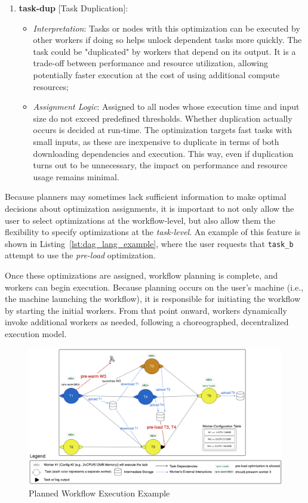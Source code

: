 \begin{enumerate}
\item\textbf{task-dup} [Task Duplication]:
\begin{itemize}
  \item \textit{Interpretation}: Tasks or nodes with this optimization can be executed by other workers if doing so helps unlock dependent tasks more quickly. The task could be "duplicated" by workers that depend on its output. It is a trade-off between performance and resource utilization, allowing potentially faster execution at the cost of using additional compute resources;
  \item \textit{Assignment Logic}: Assigned to all nodes whose execution time and input size do not exceed predefined thresholds. Whether duplication actually occurs is decided at run-time. The optimization targets fast tasks with small inputs, as these are inexpensive to duplicate in terms of both downloading dependencies and execution. This way, even if duplication turns out to be unnecessary, the impact on performance and resource usage remains minimal.
\end{itemize}
\end{enumerate}
Because planners may sometimes lack sufficient information to make optimal decisions about optimization assignments, it is important to not only allow the user to select optimizations at the workflow-level, but also allow them the flexibility to specify optimizations at the \textit{task-level}. An example of this feature is shown in Listing~\ref{lst:dag_lang_example}, where the user requests that \texttt{task\_b} attempt to use the \textit{pre-load} optimization.

Once these optimizations are assigned, workflow planning is complete, and workers can begin execution. Because planning occurs on the user's machine (i.e., the machine launching the workflow), it is responsible for initiating the workflow by starting the initial workers. From that point onward, workers dynamically invoke additional workers as needed, following a choreographed, decentralized execution model.

\begin{figure}[h]
    \centering
    \includegraphics[width=\textwidth]{Images/mine/solution_workflowinstanceexample.png}
    \caption{Planned Workflow Execution Example}
    \label{fig:planned_workflow_execution_example}
\end{figure}

